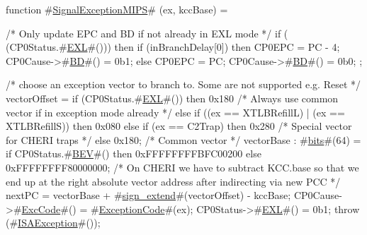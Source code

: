 function #\hyperref[zSignalExceptionMIPS]{SignalExceptionMIPS}# (ex, kccBase) = 
  {
    /* Only update EPC and BD if not already in EXL mode */
    if (~ (CP0Status.#\hyperref[zEXL]{EXL}#())) then 
      {
        if (inBranchDelay[0]) then
          {
            CP0EPC = PC - 4;
            CP0Cause->#\hyperref[zBD]{BD}#() = 0b1;
          }
        else
          {
            CP0EPC = PC;
            CP0Cause->#\hyperref[zBD]{BD}#() = 0b0;
          }
      };

      /* choose an exception vector to branch to. Some are not supported 
         e.g. Reset */
      vectorOffset = 
        if (CP0Status.#\hyperref[zEXL]{EXL}#()) then
          0x180 /* Always use common vector if in exception mode already */
        else if ((ex == XTLBRefillL) | (ex == XTLBRefillS)) then 
          0x080
        else if (ex == C2Trap) then
          0x280 /* Special vector for CHERI traps */
        else
          0x180; /* Common vector */
      vectorBase : #\hyperref[zbits]{bits}#(64) = if CP0Status.#\hyperref[zBEV]{BEV}#() then
                   0xFFFFFFFFBFC00200
                else
                   0xFFFFFFFF80000000;
      /* On CHERI we have to subtract KCC.base so that we end up at the 
         right absolute vector address after indirecting via new PCC */
      nextPC = vectorBase + #\hyperref[zsignzyextend]{sign\_extend}#(vectorOffset) - kccBase;
      CP0Cause->#\hyperref[zExcCode]{ExcCode}#() = #\hyperref[zExceptionCode]{ExceptionCode}#(ex);
      CP0Status->#\hyperref[zEXL]{EXL}#()    = 0b1;
      throw (#\hyperref[zISAException]{ISAException}#());
  }
